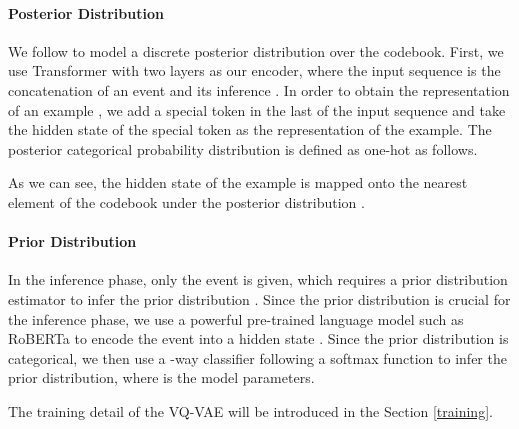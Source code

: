 \documentclass[11pt,a4paper]{article}
\begin{document}
\paragraph{Posterior Distribution} We follow \citet{van2017neural} to model a discrete posterior distribution  over the codebook.
First, we use Transformer \cite{vaswani2017attention} with two layers as our encoder, where the input sequence is the concatenation of an event  and its inference . In order to obtain the representation of an example , we add a special token in the last of the input sequence and take the hidden state  of the special token as the representation of the example. 
The posterior categorical probability distribution  is defined as one-hot as follows.

As we can see, the hidden state  of the example is mapped onto the nearest element  of the codebook under the posterior distribution .


\paragraph{Prior Distribution}
In the inference phase, only the event  is given, which requires a prior distribution estimator to infer the prior distribution . Since the prior distribution is crucial for the inference phase, we use a powerful pre-trained language model such as RoBERTa \cite{liu2019roberta} to encode the event into a hidden state . 
Since the prior distribution is categorical, we then use a -way classifier following a softmax function to infer the prior distribution, where  is the model parameters.


The training detail of the VQ-VAE will be introduced in the Section \ref{training}.
\end{document}
